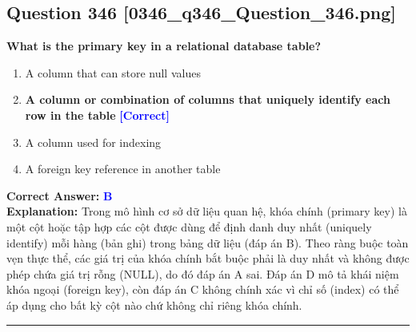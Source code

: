 \documentclass[11pt,a4paper]{article}
\begin{document}
\begin{minipage}{\textwidth}
\subsection*{Question 346 \quad \footnotesize{[0346\_q346\_Question\_346.png]}}
\noindent \textbf{What is the primary key in a relational database table?}

\begin{enumerate}[label=\Alph*.]
    \item A column that can store null values
    \item \textbf{A column or combination of columns that uniquely identify each row in the table} \hfill \textcolor{blue}{\textbf{[Correct]}}
    \item A column used for indexing
    \item A foreign key reference in another table
\end{enumerate}

\noindent \textbf{Correct Answer:} \textcolor{blue}{\textbf{B}} \\[2pt]
\noindent \textbf{Explanation:} Trong mô hình cơ sở dữ liệu quan hệ, khóa chính (primary key) là một cột hoặc tập hợp các cột được dùng để định danh duy nhất (uniquely identify) mỗi hàng (bản ghi) trong bảng dữ liệu (đáp án B). Theo ràng buộc toàn vẹn thực thể, các giá trị của khóa chính bắt buộc phải là duy nhất và không được phép chứa giá trị rỗng (NULL), do đó đáp án A sai. Đáp án D mô tả khái niệm khóa ngoại (foreign key), còn đáp án C không chính xác vì chỉ số (index) có thể áp dụng cho bất kỳ cột nào chứ không chỉ riêng khóa chính.

\par\vspace{0.3cm}
\hrule
\vspace{0.3cm}
\end{minipage}
\end{document}
